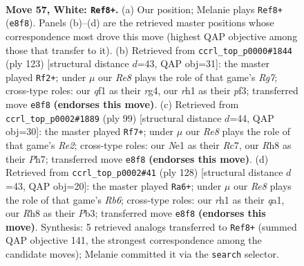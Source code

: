\documentclass[11pt]{article}
\begin{document}
\clearpage

\begin{figure}[p]\centering
\begin{subfigure}{0.46\textwidth}\centering
\resizebox{\linewidth}{!}{%
\newchessgame
\chessboard[
  setfen={4R2R/5k2/8/2p4P/8/8/1P6/3KNq1r w - - 0 57},
  showmover=false,
  pgfstyle=straightmove, color=movearrow, markmove={e8-f8}
]}
\caption{}
\end{subfigure}\hfill
\begin{subfigure}{0.46\textwidth}\centering
\resizebox{\linewidth}{!}{%
\newchessgame
\chessboard[
  setfen={8/8/3P4/7k/6R1/5Pp1/6rr/1R3K2 b - - 4 62},
  showmover=false,
  pgfstyle=straightmove, color=movearrow, markmove={g2-f2}
]}
\caption{}
\end{subfigure}
\\[4pt]
\begin{subfigure}{0.46\textwidth}\centering
\resizebox{\linewidth}{!}{%
\newchessgame
\chessboard[
  setfen={8/2r1r2p/5Kp1/QP6/6P1/1k6/8/8 b - - 0 50},
  showmover=false,
  pgfstyle=straightmove, color=movearrow, markmove={e7-f7}
]}
\caption{}
\end{subfigure}\hfill
\begin{subfigure}{0.46\textwidth}\centering
\resizebox{\linewidth}{!}{%
\newchessgame
\chessboard[
  setfen={8/k5r1/1R6/PK1R1B2/8/1P6/8/q7 w - - 7 65},
  showmover=false,
  pgfstyle=straightmove, color=movearrow, markmove={b6-a6}
]}
\caption{}
\end{subfigure}
\caption{\textbf{Move 57, White: \texttt{Ref8+}.} (a) Our position; Melanie plays \texttt{Ref8+} (\texttt{e8f8}). Panels (b)--(d) are the retrieved master positions whose correspondence most drove this move (highest QAP objective among those that transfer to it). (b) Retrieved from \texttt{ccrl\_top\_p0000\#1844} (ply 123) [structural distance $d$=43, QAP obj=31]: the master played \texttt{Rf2+}; under $\mu$ our \emph{Re8} plays the role of that game's \emph{Rg7}; cross-type roles: our \emph{q}f1 as their \emph{r}g4, our \emph{r}h1 as their \emph{p}f3; transferred move \texttt{e8f8} \textbf{(endorses this move)}. (c) Retrieved from \texttt{ccrl\_top\_p0002\#1889} (ply 99) [structural distance $d$=44, QAP obj=30]: the master played \texttt{Rf7+}; under $\mu$ our \emph{Re8} plays the role of that game's \emph{Re2}; cross-type roles: our \emph{N}e1 as their \emph{R}c7, our \emph{R}h8 as their \emph{P}h7; transferred move \texttt{e8f8} \textbf{(endorses this move)}. (d) Retrieved from \texttt{ccrl\_top\_p0002\#41} (ply 128) [structural distance $d$=43, QAP obj=20]: the master played \texttt{Ra6+}; under $\mu$ our \emph{Re8} plays the role of that game's \emph{Rb6}; cross-type roles: our \emph{r}h1 as their \emph{q}a1, our \emph{R}h8 as their \emph{P}b3; transferred move \texttt{e8f8} \textbf{(endorses this move)}. Synthesis: 5 retrieved analogs transferred to \texttt{Ref8+} (summed QAP objective 141, the strongest correspondence among the candidate moves); Melanie committed it via the \texttt{search} selector.}
\label{fig:thought-m112}
\end{figure}
\end{document}
